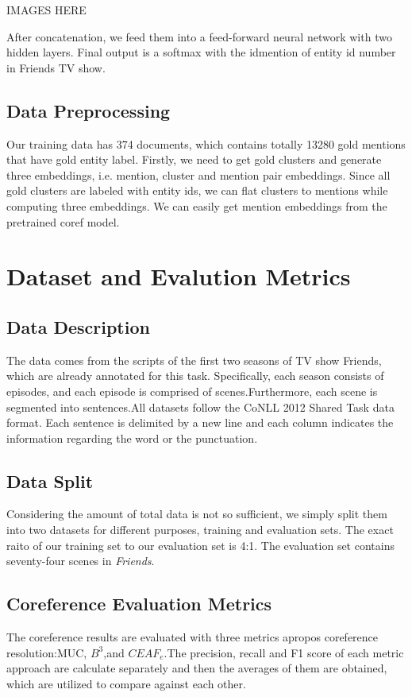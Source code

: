 \documentclass[11pt]{article}
\begin{document}
IMAGES HERE

After concatenation, we feed them into a feed-forward neural network with two hidden layers. Final output is a softmax with the idmention of entity id number in Friends TV show.

\subsection{Data Preprocessing}
Our training data has 374 documents, which contains totally 13280 gold mentions that have gold entity label. Firstly, we need to get gold clusters and generate three embeddings, i.e. mention, cluster and mention pair embeddings. Since all gold clusters are labeled with entity ids, we can flat clusters to mentions while computing three embeddings. We can easily get mention embeddings from the pretrained coref model.


\section{Dataset and Evalution Metrics}
\subsection{Data Description}
The data comes from the scripts of the first two seasons of TV show Friends, which are already annotated for this task. Specifically, each season consists of episodes, and each episode is comprised of scenes.Furthermore, each scene is segmented into sentences.All datasets follow the CoNLL 2012 Shared Task data format. Each sentence is delimited by a new line and each column indicates the information regarding the word or the punctuation.
\subsection{Data Split}
Considering the amount of total data is not so sufficient, we simply split them into two datasets for different purposes, training and evaluation sets. The exact raito of our training set to our evaluation set is 4:1. The evaluation set contains seventy-four scenes in \textit{Friends}.

\subsection{Coreference Evaluation Metrics}
The coreference results are evaluated with three metrics apropos coreference resolution:MUC, $B^{3}$,and $CEAF_e$.The precision, recall and F1 score of each metric approach are calculate separately and then the averages of them are obtained, which are utilized to compare against each other.
\end{document}
